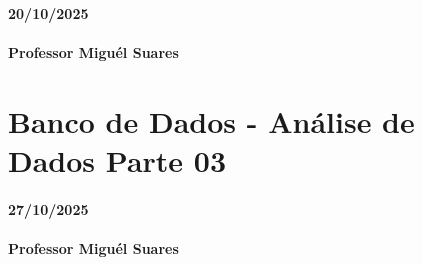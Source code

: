 \documentclass[
]{book}
\begin{document}
\subsubsection*{20/10/2025}\label{section-18}

\subsubsection*{Professor Miguél Suares}\label{professor-miguuxe9l-suares-18}

\chapter{Banco de Dados - Análise de Dados Parte 03}\label{banco-de-dados---anuxe1lise-de-dados-parte-03}

\subsubsection*{27/10/2025}\label{section-19}

\subsubsection*{Professor Miguél Suares}\label{professor-miguuxe9l-suares-19}


\end{document}
